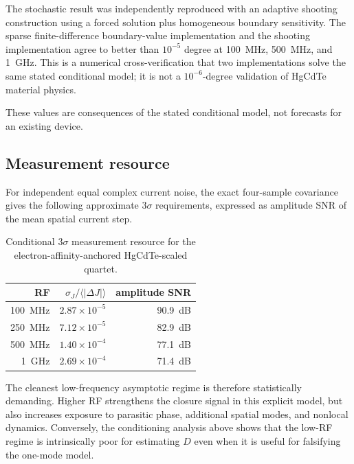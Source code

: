 \documentclass[11pt]{article}
\begin{document}
The stochastic result was independently reproduced with an adaptive shooting construction using a forced solution plus homogeneous boundary sensitivity. The sparse finite-difference boundary-value implementation and the shooting implementation agree to better than $10^{-5}$ degree at \SI{100}{MHz}, \SI{500}{MHz}, and \SI{1}{GHz}. This is a numerical cross-verification that two implementations solve the same stated conditional model; it is not a $10^{-6}$-degree validation of HgCdTe material physics.

These values are consequences of the stated conditional model, not forecasts for an existing device.

\subsection{Measurement resource}

For independent equal complex current noise, the exact four-sample covariance gives the following approximate $3\sigma$ requirements, expressed as amplitude SNR of the mean spatial current step.
\begin{table}[H]
\centering
\caption{Conditional $3\sigma$ measurement resource for the electron-affinity-anchored HgCdTe-scaled quartet.}
\begin{tabular}{rrr}
\toprule
RF & $\sigma_J/\langle|\Delta J|\rangle$ & amplitude SNR \\
\midrule
\SI{100}{MHz} & $2.87\times10^{-5}$ & \SI{90.9}{dB} \\
\SI{250}{MHz} & $7.12\times10^{-5}$ & \SI{82.9}{dB} \\
\SI{500}{MHz} & $1.40\times10^{-4}$ & \SI{77.1}{dB} \\
\SI{1}{GHz} & $2.69\times10^{-4}$ & \SI{71.4}{dB} \\
\bottomrule
\end{tabular}
\end{table}
The cleanest low-frequency asymptotic regime is therefore statistically demanding. Higher RF strengthens the closure signal in this explicit model, but also increases exposure to parasitic phase, additional spatial modes, and nonlocal dynamics. Conversely, the conditioning analysis above shows that the low-RF regime is intrinsically poor for estimating $D$ even when it is useful for falsifying the one-mode model.
\end{document}
